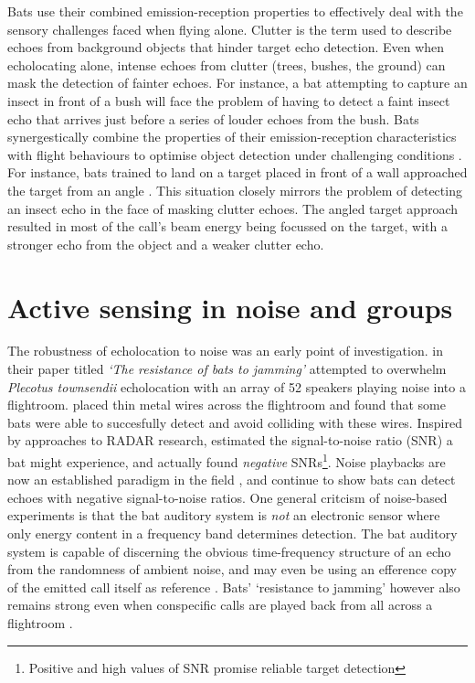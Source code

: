 \documentclass[
]{book}
\begin{document}
Bats use their combined emission-reception properties to effectively deal with the sensory challenges faced when flying alone. Clutter is the term used to describe echoes from background objects that hinder target echo detection. Even when echolocating alone, intense echoes from clutter (trees, bushes, the ground) can mask the detection of fainter echoes. For instance, a bat attempting to capture an insect in front of a bush will face the problem of having to detect a faint insect echo that arrives just before a series of louder echoes from the bush. Bats synergestically combine the properties of their emission-reception characteristics with flight behaviours to optimise object detection under challenging conditions \citep{yovel2010optimal, taub2020segregating}. For instance, bats trained to land on a target placed in front of a wall approached the target from an angle \citep{taub2020segregating}. This situation closely mirrors the problem of detecting an insect echo in the face of masking clutter echoes. The angled target approach resulted in most of the call's beam energy being focussed on the target, with a stronger echo from the object and a weaker clutter echo.

\hypertarget{active-sensing-in-noise-and-groups}{%
\section{Active sensing in noise and groups}\label{active-sensing-in-noise-and-groups}}

The robustness of echolocation to noise was an early point of investigation. \citet{griffinresistance} in their paper titled \emph{`The resistance of bats to jamming'} attempted to overwhelm \emph{Plecotus townsendii} echolocation with an array of 52 speakers playing noise into a flightroom. \citet{griffinresistance} placed thin metal wires across the flightroom and found that some bats were able to succesfully detect and avoid colliding with these wires. Inspired by approaches to RADAR research, \citet{griffinresistance} estimated the signal-to-noise ratio (SNR) a bat might experience, and actually found \emph{negative} SNRs\footnote{Positive and high values of SNR promise reliable target detection}. Noise playbacks are now an established paradigm in the field \citep{roverud1985discrimination, m1989a, jones1994individual, tressler2009context, hage2013ambient, hage2014ambient, luo2015a}, and continue to show bats can detect echoes with negative signal-to-noise ratios. One general critcism of noise-based experiments is that the bat auditory system is \emph{not} an electronic sensor where only energy content in a frequency band determines detection. The bat auditory system is capable of discerning the obvious time-frequency structure of an echo from the randomness of ambient noise, and may even be using an efference copy of the emitted call itself as reference \citep{simmons2012biosonar}. Bats' `resistance to jamming' however also remains strong even when conspecific calls are played back from all across a flightroom \citep{amichai2015a}.
\end{document}
